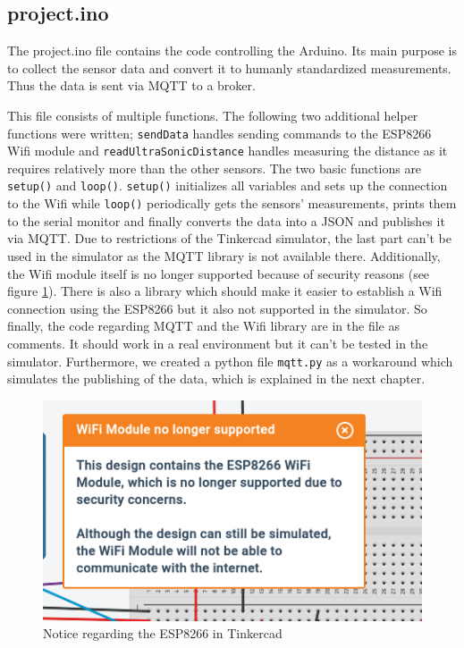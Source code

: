 \documentclass{article}
\begin{document}
\subsection{project.ino}
The project.ino file contains the code controlling the Arduino. Its main purpose is to collect the sensor data and convert it to humanly standardized measurements. Thus the data is sent via MQTT to a broker. \par
This file consists of multiple functions. The following two additional helper functions were written; \texttt{sendData} handles sending commands to the ESP8266 Wifi module and \texttt{readUltraSonicDistance} handles measuring the distance as it requires relatively more than the other sensors. The two basic functions are \texttt{setup()} and \texttt{loop()}. \texttt{setup()} initializes all variables and sets up the connection to the Wifi while \texttt{loop()} periodically gets the sensors' measurements, prints them to the serial monitor and finally converts the data into a JSON and publishes it via MQTT. Due to restrictions of the Tinkercad simulator, the last part can't be used in the simulator as the MQTT library is not available there. Additionally, the Wifi module itself is no longer supported because of security reasons (see figure \ref{fig:security}). There is also a library which should make it easier to establish a Wifi connection using the ESP8266 but it also not supported in the simulator. So finally, the code regarding MQTT and the Wifi library are in the file as comments. It should work in a real environment but it can't be tested in the simulator. Furthermore, we created a python file \texttt{mqtt.py} as a workaround which simulates the publishing of the data, which is explained in the next chapter.\par
\begin{figure}
    \centering
    \includegraphics[scale=0.4]{security.png}
    \caption{Notice regarding the ESP8266 in Tinkercad}
    \label{fig:security}
\end{figure}
\end{document}
